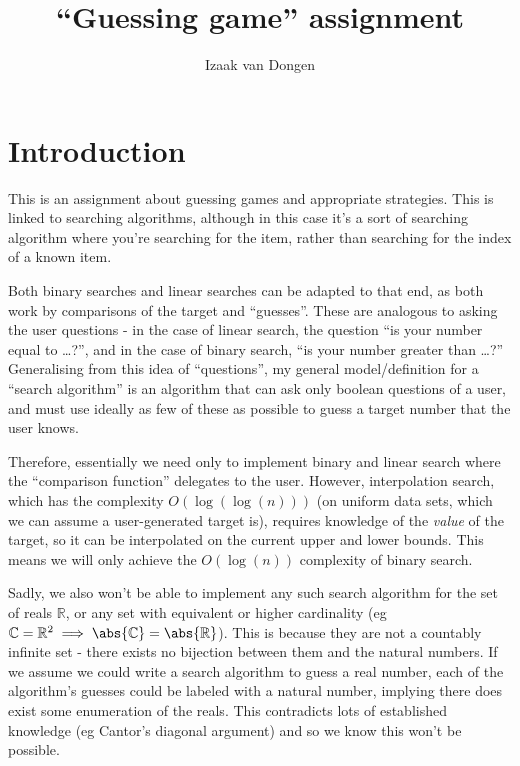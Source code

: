 \documentclass[fleqn,a4paper,11pt]{article}
\title{``Guessing game'' assignment}
\author{Izaak van Dongen}
\begin{document}
    \maketitle
    \tableofcontents
    \lstlistoflistings
    \listoffigures

    \section{Introduction}

    This is an assignment about guessing games and appropriate strategies. This
    is linked to searching algorithms, although in this case it's a sort of
    searching algorithm where you're searching for the item, rather than
    searching for the index of a known item.

    Both binary searches and linear searches can be adapted to that end, as both
    work by comparisons of the target and ``guesses''. These are analogous to
    asking the user questions - in the case of linear search, the question ``is
    your number equal to \ldots?'', and in the case of binary search, ``is your
    number greater than \ldots?'' Generalising from this idea of ``questions'',
    my general model/definition for a ``search algorithm'' is an algorithm that
    can ask only boolean questions of a user, and must use ideally as few of
    these as possible to guess a target number that the user knows.

    Therefore, essentially we need only to implement binary and linear search
    where the ``comparison function'' delegates to the user.  However,
    interpolation search, which has the complexity \(O(\log(\log(n)))\) (on
    uniform data sets, which we can assume a user-generated target is), requires
    knowledge of the \emph{value} of the target, so it can be interpolated on
    the current upper and lower bounds. This means we will only achieve the
    \(O(\log(n))\) complexity of binary search.

    Sadly, we also won't be able to implement any such search algorithm for the
    set of reals \(\mathbb{R}\), or any set with equivalent or higher cardinality
    (eg \(\mathbb{C} = \mathbb{R}^2 \implies \abs{\mathbb{C}} =
    \abs{\mathbb{R}}\)). This is because they are not a countably infinite set -
    there exists no bijection between them and the natural numbers. If we assume
    we could write a search algorithm to guess a real number, each of the
    algorithm's guesses could be labeled with a natural number, implying there
    does exist some enumeration of the reals. This contradicts lots of
    established knowledge (eg Cantor's diagonal argument) and so we know this
    won't be possible.
\end{document}
